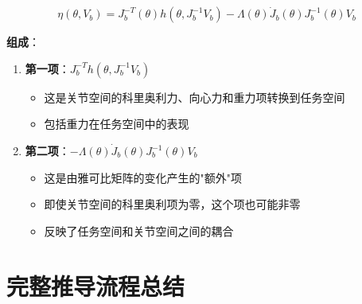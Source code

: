 \documentclass{article}
\begin{document}
\begin{equation}
\eta(\theta, V_b) = J_b^{-T}(\theta)h(\theta, J_b^{-1}V_b) - \Lambda(\theta)\dot{J}_b(\theta)J_b^{-1}(\theta)V_b
\end{equation}

\textbf{组成}：
\begin{enumerate}
\item \textbf{第一项}：$J_b^{-T}h(\theta, J_b^{-1}V_b)$
\begin{itemize}
\item 这是关节空间的科里奥利力、向心力和重力项转换到任务空间
\item 包括重力在任务空间中的表现
\end{itemize}

\item \textbf{第二项}：$-\Lambda(\theta)\dot{J}_b(\theta)J_b^{-1}(\theta)V_b$
\begin{itemize}
\item 这是由雅可比矩阵的变化产生的"额外"项
\item 即使关节空间的科里奥利项为零，这个项也可能非零
\item 反映了任务空间和关节空间之间的耦合
\end{itemize}
\end{enumerate}

\section{完整推导流程总结}
\end{document}
